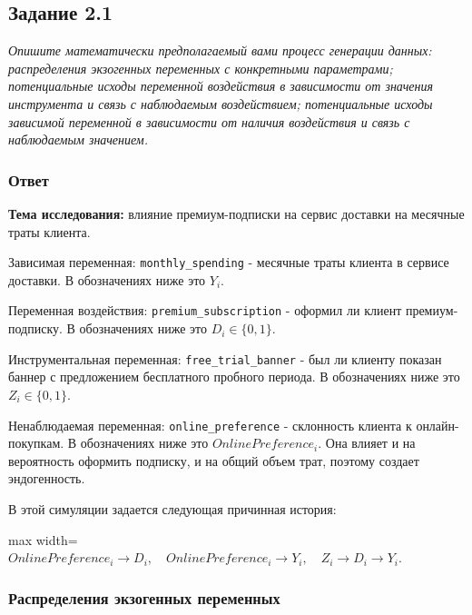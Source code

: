 \documentclass[11pt]{article}
\newenvironment{tasktext}
      {\begin{tcolorbox}[breakable, colback=black!3, colframe=black!28,
        boxrule=0.4pt, arc=1.5mm, left=7pt, right=7pt, top=5pt, bottom=5pt,
        before skip=0.35em, after skip=0.75em]\itshape}
      {\end{tcolorbox}}
\begin{document}
\subsection{Задание 2.1}\label{ux437ux430ux434ux430ux43dux438ux435-2.1}

\begin{tasktext}
Опишите математически предполагаемый вами процесс генерации данных:
распределения экзогенных переменных с конкретными параметрами;
потенциальные исходы переменной воздействия в зависимости от значения
инструмента и связь с наблюдаемым воздействием; потенциальные исходы
зависимой переменной в зависимости от наличия воздействия и связь с
наблюдаемым значением.
\end{tasktext}

\subsubsection{Ответ}\label{ux43eux442ux432ux435ux442}

\textbf{Тема исследования:} влияние премиум-подписки на сервис доставки
на месячные траты клиента.

Зависимая переменная: \texttt{monthly\_spending} - месячные траты
клиента в сервисе доставки. В обозначениях ниже это \(Y_i\).

Переменная воздействия: \texttt{premium\_subscription} - оформил ли
клиент премиум-подписку. В обозначениях ниже это \(D_i \in \{0,1\}\).

Инструментальная переменная: \texttt{free\_trial\_banner} - был ли
клиенту показан баннер с предложением бесплатного пробного периода. В
обозначениях ниже это \(Z_i \in \{0,1\}\).

Ненаблюдаемая переменная: \texttt{online\_preference} - склонность
клиента к онлайн-покупкам. В обозначениях ниже это
\(OnlinePreference_i\). Она влияет и на вероятность оформить подписку, и
на общий объем трат, поэтому создает эндогенность.

В этой симуляции задается следующая причинная история:

\begin{center}
\begin{adjustbox}{max width=\linewidth}
\(\displaystyle OnlinePreference_i \rightarrow D_i, \quad OnlinePreference_i \rightarrow Y_i, \quad Z_i \rightarrow D_i \rightarrow Y_i.\)
\end{adjustbox}
\end{center}

\subsubsection{Распределения экзогенных
переменных}\label{ux440ux430ux441ux43fux440ux435ux434ux435ux43bux435ux43dux438ux44f-ux44dux43aux437ux43eux433ux435ux43dux43dux44bux445-ux43fux435ux440ux435ux43cux435ux43dux43dux44bux445}
\end{document}
